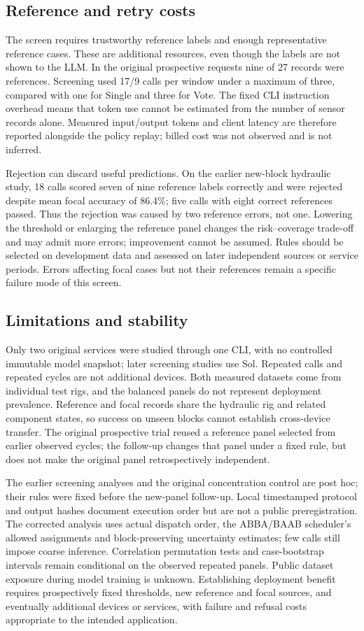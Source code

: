 \documentclass[11pt,a4paper]{article}
\begin{document}
\subsection{Reference and retry costs}
The screen requires trustworthy reference labels and enough representative reference cases. These are additional resources, even though the labels are not shown to the LLM. In the original prospective requests nine of 27 records were references. Screening used 17/9 calls per window under a maximum of three, compared with one for Single and three for Vote. The fixed CLI instruction overhead means that token use cannot be estimated from the number of sensor records alone. Measured input/output tokens and client latency are therefore reported alongside the policy replay; billed cost was not observed and is not inferred.

Rejection can discard useful predictions. On the earlier new-block hydraulic study, 18 calls scored seven of nine reference labels correctly and were rejected despite mean focal accuracy of 86.4\%; five calls with eight correct references passed. Thus the rejection was caused by two reference errors, not one. Lowering the threshold or enlarging the reference panel changes the risk--coverage trade-off and may admit more errors; improvement cannot be assumed. Rules should be selected on development data and assessed on later independent sources or service periods. Errors affecting focal cases but not their references remain a specific failure mode of this screen.

\subsection{Limitations and stability}
Only two original services were studied through one CLI, with no controlled immutable model snapshot; later screening studies use Sol. Repeated calls and repeated cycles are not additional devices. Both measured datasets come from individual test rigs, and the balanced panels do not represent deployment prevalence. Reference and focal records share the hydraulic rig and related component states, so success on unseen blocks cannot establish cross-device transfer. The original prospective trial reused a reference panel selected from earlier observed cycles; the follow-up changes that panel under a fixed rule, but does not make the original panel retrospectively independent.

The earlier screening analyses and the original concentration control are post hoc; their rules were fixed before the new-panel follow-up. Local timestamped protocol and output hashes document execution order but are not a public preregistration. The corrected analysis uses actual dispatch order, the ABBA/BAAB scheduler's allowed assignments and block-preserving uncertainty estimates; few calls still impose coarse inference. Correlation permutation tests and case-bootstrap intervals remain conditional on the observed repeated panels. Public dataset exposure during model training is unknown. Establishing deployment benefit requires prospectively fixed thresholds, new reference and focal sources, and eventually additional devices or services, with failure and refusal costs appropriate to the intended application.
\end{document}
